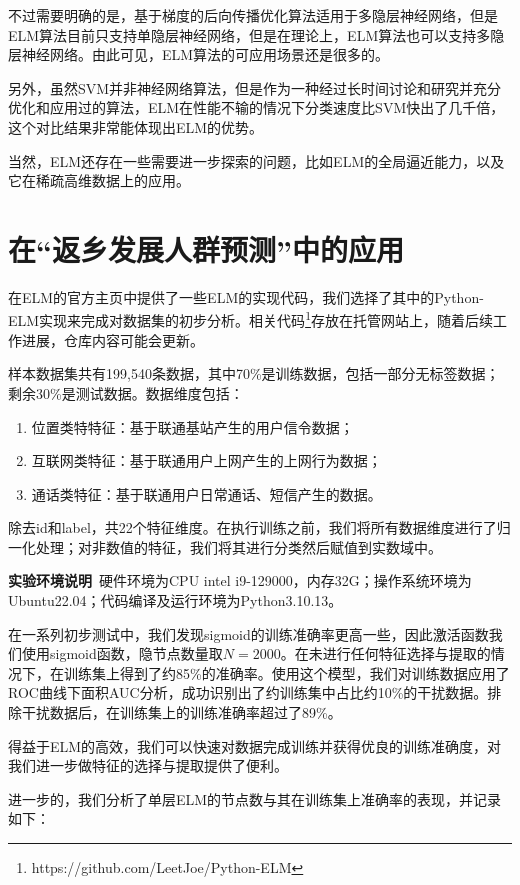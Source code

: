\documentclass[conference]{IEEEtran}
\begin{document}
不过需要明确的是，基于梯度的后向传播优化算法适用于多隐层神经网络，但是ELM算法目前只支持单隐层神经网络，但是在理论上，ELM算法也可以支持多隐层神经网络。由此可见，ELM算法的可应用场景还是很多的。

另外，虽然SVM并非神经网络算法，但是作为一种经过长时间讨论和研究并充分优化和应用过的算法，ELM在性能不输的情况下分类速度比SVM快出了几千倍，这个对比结果非常能体现出ELM的优势。

当然，ELM还存在一些需要进一步探索的问题，比如ELM的全局逼近能力，以及它在稀疏高维数据上的应用。

\section{在“返乡发展人群预测”中的应用}

在ELM的官方主页\cite{ol:elmorg}中提供了一些ELM的实现代码，我们选择了其中的Python-ELM实现来完成对数据集的初步分析。相关代码\footnote{https://github.com/LeetJoe/Python-ELM}存放在托管网站上，随着后续工作进展，仓库内容可能会更新。

样本数据集共有199,540条数据，其中70\%是训练数据，包括一部分无标签数据；剩余30\%是测试数据。数据维度包括：
\begin{enumerate}
	\item 位置类特特征：基于联通基站产生的用户信令数据；
	\item 互联网类特征：基于联通用户上网产生的上网行为数据；
	\item 通话类特征：基于联通用户日常通话、短信产生的数据。
\end{enumerate}
除去id和label，共22个特征维度。在执行训练之前，我们将所有数据维度进行了归一化处理；对非数值的特征，我们将其进行分类然后赋值到实数域中。

\textbf{实验环境说明}\ 硬件环境为CPU intel i9-129000，内存32G；操作系统环境为Ubuntu22.04；代码编译及运行环境为Python3.10.13。

在一系列初步测试中，我们发现sigmoid的训练准确率更高一些，因此激活函数我们使用sigmoid函数，隐节点数量取$N=2000$。在未进行任何特征选择与提取的情况下，在训练集上得到了约85\%的准确率。使用这个模型，我们对训练数据应用了ROC曲线下面积AUC分析，成功识别出了约训练集中占比约10\%的干扰数据。排除干扰数据后，在训练集上的训练准确率超过了89\%。

得益于ELM的高效，我们可以快速对数据完成训练并获得优良的训练准确度，对我们进一步做特征的选择与提取提供了便利。

进一步的，我们分析了单层ELM的节点数与其在训练集上准确率的表现，并记录如下：
\end{document}
